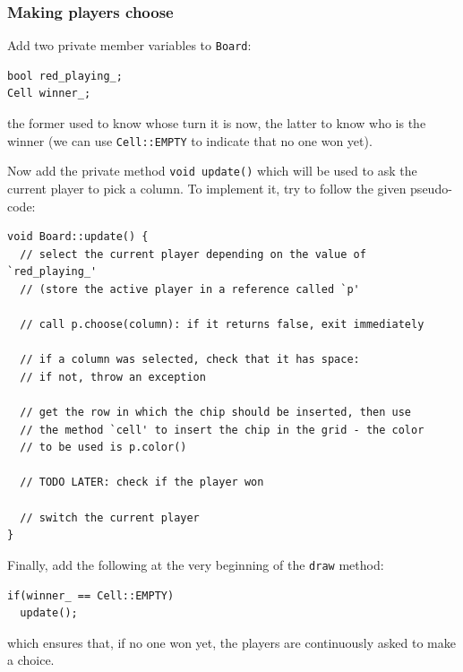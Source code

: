 \documentclass{article}
\begin{document}
\subsubsection{Making players choose}

Add two private member variables to \texttt{Board}:
\begin{center}
\begin{minipage}{.9\textwidth}
\begin{lstlisting}[style=mycpp,numbers=none]
bool red_playing_;
Cell winner_;
\end{lstlisting}
\end{minipage}
\end{center}
the former used to know whose turn it is now, the latter to know who is the winner (we can use \texttt{Cell::EMPTY} to indicate that no one won yet).

Now add the private method \texttt{void update()} which will be used to ask the current player to pick a column. To implement it, try to follow the given pseudo-code:
\begin{center}
\begin{minipage}{.9\textwidth}
\begin{lstlisting}[style=mycpp,numbers=none]
void Board::update() {
  // select the current player depending on the value of `red_playing_'
  // (store the active player in a reference called `p'
  
  // call p.choose(column): if it returns false, exit immediately
  
  // if a column was selected, check that it has space:
  // if not, throw an exception
  
  // get the row in which the chip should be inserted, then use
  // the method `cell' to insert the chip in the grid - the color
  // to be used is p.color()
  
  // TODO LATER: check if the player won
  
  // switch the current player
}
\end{lstlisting}
\end{minipage}
\end{center}

Finally, add the following at the very beginning of the \texttt{draw} method:
\begin{center}
\begin{minipage}{.9\textwidth}
\begin{lstlisting}[style=mycpp,numbers=none]
if(winner_ == Cell::EMPTY)
  update();
\end{lstlisting}
\end{minipage}
\end{center}
which ensures that, if no one won yet, the players are continuously asked to make a choice.
\end{document}
